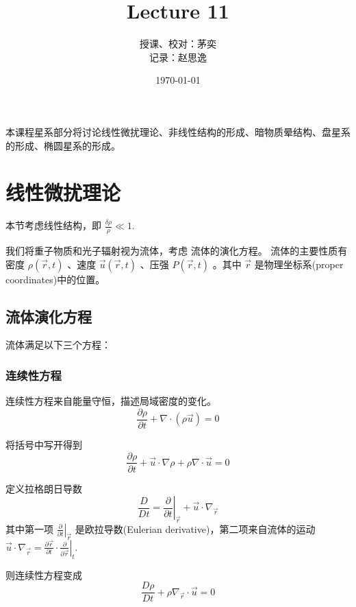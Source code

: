 \documentclass[12pt]{ctexart}
\title{Lecture 11}
\author{授课、校对：茅奕  \\ 记录：赵思逸}
\date{\today}
\begin{document}
\maketitle

本课程星系部分将讨论线性微扰理论、非线性结构的形成、暗物质晕结构、盘星系的形成、椭圆星系的形成。

\section{线性微扰理论}

本节考虑线性结构，即 $\frac{\delta \rho}{\rho} \ll 1$.

我们将重子物质和光子辐射视为流体，考虑
流体的演化方程。
流体的主要性质有 密度 $\rho\left(\vec{r},t\right) $ 、速度 $\vec{u}\left(\vec{r},t\right) $ 、压强 $P\left(\vec{r},t\right) $   。其中 $\vec{r}$ 是物理坐标系(proper coordinates)中的位置。

\subsection{流体演化方程}
流体满足以下三个方程： 

\subsubsection*{连续性方程}

连续性方程来自能量守恒，描述局域密度的变化。
\begin{equation}
    \frac{\partial \rho}{\partial t} + \nabla \cdot \left(\rho \vec{u}\right) = 0
\end{equation}

将括号中写开得到
\begin{equation}
    \frac{\partial \rho}{\partial t} + \vec{u}\cdot \nabla \rho + \rho \nabla \cdot \vec{u} = 0
\end{equation}

定义拉格朗日导数
\begin{equation}
    \frac{D}{D t} = \left.\frac{\partial}{\partial t} \right|_{\vec{r}} + \vec{u}\cdot \nabla_{\vec{r}}
\end{equation}
其中第一项 $\left.\frac{\partial}{\partial t} \right|_{\vec{r}}$ 是欧拉导数(Eulerian derivative)，第二项来自流体的运动 $\vec{u}\cdot \nabla_{\vec{r}} = \frac{\partial \vec{r}}{\partial t} \cdot \left.\frac{\partial}{\partial \vec{r}}\right|_t$.

则连续性方程变成
\begin{equation} \label{eq:continu}
    \frac{D \rho}{D t} + \rho \nabla_{\vec{r}} \cdot \vec{u} = 0
\end{equation}
\end{document}
